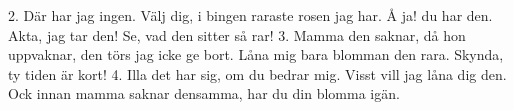 2.  Där har jag ingen.
    Välj dig, i bingen
    raraste rosen jag har.
    Å ja! du har den.
    Akta, jag tar den!
    Se, vad den sitter så rar!
3.  Mamma den saknar,
    då hon uppvaknar,
    den törs jag icke ge bort.
    Låna mig bara
    blomman den rara.
    Skynda, ty tiden är kort!
4.  Illa det har sig,
    om du bedrar mig.
    Visst vill jag låna dig den.
    Ock innan mamma
    saknar densamma,
    har du din blomma igän.
